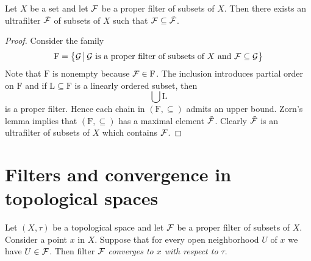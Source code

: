 \begin{proposition}\label{proposition:existence_of_ultrafilters}
Let $X$ be a set and let ${\mathcal F}$ be a proper filter of subsets of $X$. Then there exists an ultrafilter $\tilde{{\mathcal F}}$ of subsets of $X$ such that ${\mathcal F} \subseteq \tilde{{\mathcal F}}$.
\end{proposition}
\begin{proof}
Consider the family
$$\mathrm{F} = \big\{{\mathcal G}\,\big|\,{\mathcal G}\mbox{ is a proper filter of subsets of }X\mbox{ and }{\mathcal F} \subseteq {\mathcal G}\big\}$$
Note that $\mathrm{F}$ is nonempty because ${\mathcal F} \in \mathrm{F}$. The inclusion introduces partial order on $\mathrm{F}$ and if $\mathrm{L}\subseteq \mathrm{F}$ is a linearly ordered subset, then
$$\bigcup \mathrm{L}$$
is a proper filter. Hence each chain in $\left(\mathrm{F},\subseteq\right)$ admits an upper bound. Zorn's lemma implies that $\left(\mathrm{F},\subseteq\right)$ has a maximal element $\tilde{{\mathcal F}}$. Clearly $\tilde{{\mathcal F}}$ is an ultrafilter of subsets of $X$ which contains ${\mathcal F}$.
\end{proof}

\section{Filters and convergence in topological spaces}

\begin{definition}
Let $(X,\tau)$ be a topological space and let ${\mathcal F}$ be a proper filter of subsets of $X$. Consider a point $x$ in $X$. Suppose that for every open neighborhood $U$ of $x$ we have $U \in {\mathcal F}$. Then filter ${\mathcal F}$ \textit{converges to $x$ with respect to $\tau$}.
\end{definition}

